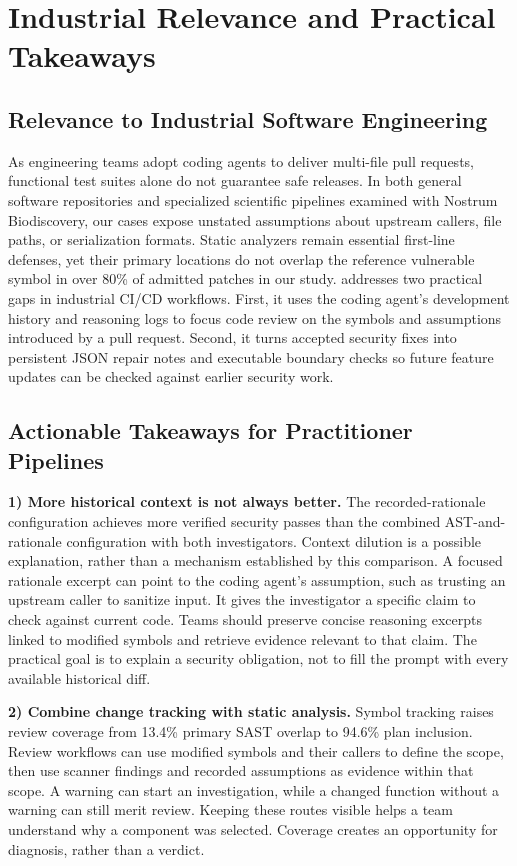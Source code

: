 \section{Industrial Relevance and Practical Takeaways}
\label{sec:implications}
\subsection{Relevance to Industrial Software Engineering}
As engineering teams adopt coding agents to deliver multi-file pull requests, functional test suites alone do not guarantee safe releases. In both general software repositories and specialized scientific pipelines examined with Nostrum Biodiscovery, our cases expose unstated assumptions about upstream callers, file paths, or serialization formats. Static analyzers remain essential first-line defenses, yet their primary locations do not overlap the reference vulnerable symbol in over 80\% of admitted patches in our study. \tracer{} addresses two practical gaps in industrial CI/CD workflows. First, it uses the coding agent's development history and reasoning logs to focus code review on the symbols and assumptions introduced by a pull request. Second, it turns accepted security fixes into persistent JSON repair notes and executable boundary checks so future feature updates can be checked against earlier security work.

\subsection{Actionable Takeaways for Practitioner Pipelines}
\noindent\textbf{1) More historical context is not always better.}
The recorded-rationale configuration achieves more verified security passes than the combined AST-and-rationale configuration with both investigators. Context dilution is a possible explanation, rather than a mechanism established by this comparison. A focused rationale excerpt can point to the coding agent's assumption, such as trusting an upstream caller to sanitize input. It gives the investigator a specific claim to check against current code. Teams should preserve concise reasoning excerpts linked to modified symbols and retrieve evidence relevant to that claim. The practical goal is to explain a security obligation, not to fill the prompt with every available historical diff.

\noindent\textbf{2) Combine change tracking with static analysis.}
Symbol tracking raises review coverage from 13.4\% primary SAST overlap to 94.6\% plan inclusion. Review workflows can use modified symbols and their callers to define the scope, then use scanner findings and recorded assumptions as evidence within that scope. A warning can start an investigation, while a changed function without a warning can still merit review. Keeping these routes visible helps a team understand why a component was selected. Coverage creates an opportunity for diagnosis, rather than a verdict.

